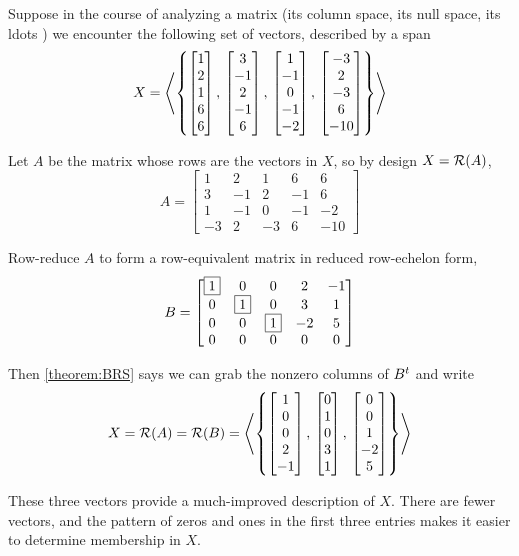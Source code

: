 \documentclass{ximera}
\begin{document}
\begin{example}

  Suppose in the course of analyzing a matrix (its column space, its
  null space, its ldots ) we encounter the following set of vectors,
  described by a span
  \[
    X=\left\langle\left\{
        \begin{bmatrix}1\\2\\1\\6\\6\end{bmatrix},\,
        \begin{bmatrix}3\\-1\\2\\-1\\6\end{bmatrix},\,
        \begin{bmatrix}1\\-1\\0\\-1\\-2\end{bmatrix},\,
        \begin{bmatrix}-3\\2\\-3\\6\\-10\end{bmatrix}
      \right\}\right\rangle
  \]

  Let $A$ be the matrix whose rows are the vectors in $X$, so by
  design $X=\mathcal{R}\!\left(A\right)$,
  \[
    A=
    \begin{bmatrix}
      1 & 2 & 1 & 6 & 6\\
      3 & -1 & 2 & -1 & 6\\
      1 & -1 & 0 & -1 & -2\\
      -3 & 2 & -3 & 6 & -10
    \end{bmatrix}
  \]

  Row-reduce $A$ to form a row-equivalent matrix in reduced
  row-echelon form,
  \[
    B=
    \begin{bmatrix}
      \fbox{1} & 0 & 0 & 2 & -1\\
      0 & \fbox{1} & 0 & 3 & 1\\
      0 & 0 & \fbox{1} & -2 & 5\\
      0 & 0 & 0 & 0 & 0
    \end{bmatrix}
  \]
  
  Then \ref{theorem:BRS} says we can grab the nonzero columns of
  $B^{t}$ and write
  \[
    X=\mathcal{R}\!\left(A\right)=\mathcal{R}\!\left(B\right)=
    \left\langle\left\{
        \begin{bmatrix}1\\0\\0\\2\\-1\end{bmatrix},\,
        \begin{bmatrix}0\\1\\0\\3\\1\end{bmatrix},\,
        \begin{bmatrix}0\\0\\1\\-2\\5\end{bmatrix}
      \right\}\right\rangle
  \]

  These three vectors provide a much-improved description of $X$.
  There are fewer vectors, and the pattern of zeros and ones in the
  first three entries makes it easier to determine membership in $X$.
\end{example}
\end{document}
